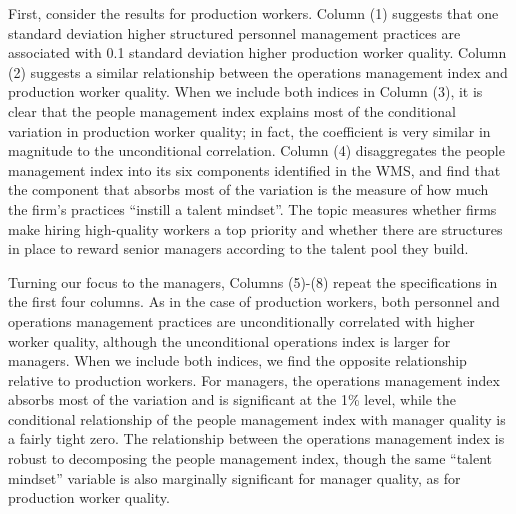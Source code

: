 
First, consider the results for production workers. Column (1) suggests that one standard deviation higher structured personnel management practices are associated with 0.1 standard deviation higher production worker quality. Column (2) suggests a similar relationship between the operations management index and production worker quality. When we include both indices in Column (3), it is clear that the people management index explains most of the conditional variation in production worker quality; in fact, the coefficient is very similar in magnitude to the unconditional correlation. Column (4) disaggregates the people management index into its six components identified in the WMS, and find that the component that absorbs most of the variation is the measure of how much the firm's practices ``instill a talent mindset''. The topic measures whether firms make hiring high-quality workers a top priority and whether there are structures in place to reward senior managers according to the talent pool they build. 
 
 
Turning our focus to the managers, Columns (5)-(8) repeat the specifications in the first four columns. As in the case of production workers, both personnel and operations management practices are unconditionally correlated with higher worker quality, although the unconditional operations index is larger for managers. %
%
When we include both indices, we find the opposite relationship relative to production workers. For managers, the operations management index absorbs most of the variation and is significant at the 1\% level, while the conditional relationship of the people management index with manager quality is a fairly tight zero. The relationship between the operations management index is robust to decomposing the people management index, though the same ``talent mindset'' variable is also marginally significant for manager quality, as for production worker quality. 

